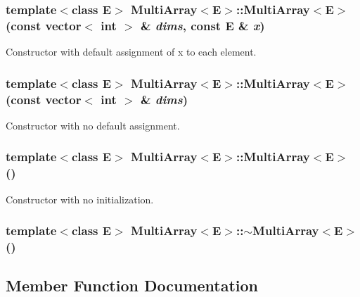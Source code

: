 \subsubsection{\setlength{\rightskip}{0pt plus 5cm}template$<$class E$>$ Multi\-Array$<$E$>$::Multi\-Array$<$E$>$ (const vector$<$ int $>$ \& {\em dims}, const E \& {\em x})}\label{class_MultiArray_a0}


Constructor with default assignment of x to each element.

\subsubsection{\setlength{\rightskip}{0pt plus 5cm}template$<$class E$>$ Multi\-Array$<$E$>$::Multi\-Array$<$E$>$ (const vector$<$ int $>$ \& {\em dims})}\label{class_MultiArray_a1}


Constructor with no default assignment.

\subsubsection{\setlength{\rightskip}{0pt plus 5cm}template$<$class E$>$ Multi\-Array$<$E$>$::Multi\-Array$<$E$>$ ()\hspace{0.3cm}{\tt  [inline]}}\label{class_MultiArray_a2}


Constructor with no initialization.

\subsubsection{\setlength{\rightskip}{0pt plus 5cm}template$<$class E$>$ Multi\-Array$<$E$>$::$\sim$Multi\-Array$<$E$>$ ()\hspace{0.3cm}{\tt  [inline]}}\label{class_MultiArray_a3}




\subsection{Member Function Documentation}
